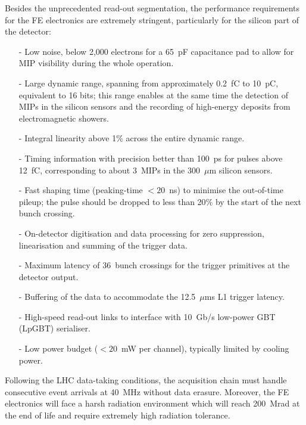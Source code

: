Besides the unprecedented read-out segmentation, the performance requirements for the FE electronics are extremely stringent, particularly for the silicon part of the detector:
\begin{itemize}
    \item [-] Low noise, below 2,000 electrons for a 65~pF capacitance pad to allow for MIP visibility during the whole operation.
    \item [-] Large dynamic range, spanning from approximately 0.2~fC to 10~pC, equivalent to 16 bits; this range enables at the same time the detection of MIPs in the silicon sensors and the recording of high-energy deposits from electromagnetic showers. 
    \item [-] Integral linearity above 1$\%$ across the entire dynamic range.
    \item [-] Timing information with precision better than 100~ps for pulses above 12~fC, corresponding to about 3~MIPs in the 300~$\mu$m silicon sensors.
    \item [-] Fast shaping time (peaking-time $<20$~ns) to minimise the out-of-time pileup; the pulse should be dropped to less than 20$\%$ by the start of the next bunch crossing.
    \item [-] On-detector digitisation and data processing for zero suppression, linearisation and summing of the trigger data.
    \item [-] Maximum latency of 36~bunch crossings for the trigger primitives at the detector output.
    \item [-] Buffering of the data to accommodate the 12.5~$\mu$ms L1 trigger latency.
    \item [-] High-speed read-out links to interface with 10~Gb/s low-power GBT (LpGBT) serialiser.
    \item [-] Low power budget ($<20$~mW per channel), typically limited by cooling power.
\end{itemize}

Following the LHC data-taking conditions, the acquisition chain must handle consecutive event arrivals at 40~MHz without data erasure.
Moreover, the FE electronics will face a harsh radiation environment which will reach 200~Mrad at the end of life and require extremely high radiation tolerance.

\bigbreak

